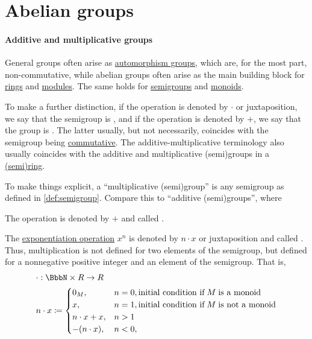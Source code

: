 \section{Abelian groups}\label{sec:abelian_groups}

\paragraph{Additive and multiplicative groups}

\begin{concept}\label{con:additive_semigroup}\mimprovised
  General groups often arise as \hyperref[def:automorphism_group]{automorphism groups}, which are, for the most part, non-commutative, while abelian groups often arise as the main building block for \hyperref[def:ring]{rings} and \hyperref[def:module]{modules}. The same holds for \hyperref[def:semigroup]{semigroups} and \hyperref[def:monoid]{monoids}.

  To make a further distinction, if the operation is denoted by \( \cdot \) or juxtaposition, we say that the semigroup is , and if the operation is denoted by \( + \), we say that the group is . The latter usually, but not necessarily, coincides with the semigroup being \hyperref[def:binary_operation/commutative]{commutative}. The additive-multiplicative terminology also usually coincides with the additive and multiplicative (semi)groups in a \hyperref[def:semiring]{(semi)ring}.

  To make things explicit, a \enquote{multiplicative (semi)group} is any semigroup as defined in \cref{def:semigroup}. Compare this to \enquote{additive (semi)groups}, where
  \begin{thmenum}
     The operation is denoted by \( + \) and called .

     The \hyperref[def:semigroup/exponentiation]{exponentiation operation} \( x^n \) is denoted by \( n \cdot x \) or juxtaposition and called . Thus, multiplication is not defined for two elements of the semigroup, but defined for a nonnegative positive integer and an element of the semigroup. That is,
    \begin{equation}\label{eq:con:additive_semigroup/multiplication}
      \begin{aligned}
        &\cdot: \BbbN \times R \to R \\
        &n \cdot x \coloneqq \begin{cases}
          0_M,           &n = 0, \T{initial condition if} M \T{is a monoid} \\
          x,             &n = 1, \T{initial condition if} M \T{is not a monoid} \\
          n \cdot x + x, &n > 1 \\
          -(n \cdot x),  &n < 0, \\
        \end{cases}
      \end{aligned}
    \end{equation}


\end{thmenum}
\end{concept}

